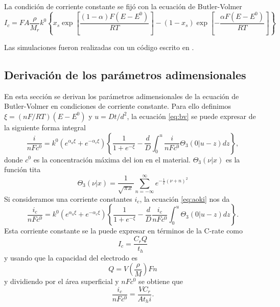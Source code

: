 La condición de corriente constante se fijó con la ecuación de Butler-Volmer
\begin{equation}\label{eq:bv}
    I_c = F A \frac{\rho}{M_r} k^0 \left\{x_s \exp\left[ \frac{(1-\alpha)F(E-E^0)}{RT} \right] - (1 - x_s) \exp\left[ -\frac{\alpha F (E-E^0)}{RT} \right] \right\}
\end{equation}

Las simulaciones fueron realizadas con un código escrito en .


\subsection{Derivación de los parámetros adimensionales} 

En esta sección se derivan los parámetros adimensionales de la ecuación de
Butler-Volmer en condiciones de corriente constante. Para ello definimos
$\xi = (nF/RT)(E - E^0)$ y $u = D t / d^2$, la ecuación \ref{eq:bv} se puede 
expresar de la siguiente forma integral \cite{aoki1984}
\begin{equation}\label{eq:aoki}
    \frac{i}{n F c^0} = k^0 \left(e^{\alpha_a \xi} + e^{-\alpha_c \xi}\right) \left\{ \frac{1}{1+e^{-\xi}} - \frac{d}{D} \int_0^u \frac{i}{n F c^0} \Theta_3(0|u - z) dz \right\},
\end{equation}
donde $c^0$ es la concentración máxima del ion en el material. 
$\Theta_3(\nu|x)$ es la función tita \cite{bieniasz2015}
\begin{equation}
    \Theta_3(\nu|x) = \frac{1}{\sqrt{\pi x}} \sum_{n=-\infty}^{\infty} e^{-\frac{1}{x}(\nu + n)^2}
\end{equation}
Si consideramos una corriente constantes $i_c$, la ecuación \ref{eq:aoki} nos da
\begin{equation}\label{eq:aoki2}
    \frac{i_c}{n F c^0} = k^0 \left(e^{\alpha_a \xi} + e^{-\alpha_c \xi}\right) \left\{ \frac{1}{1+e^{-\xi}} - \frac{d}{D} \frac{i_c}{n F c^0} \int_0^u \Theta_3(0|u - z) dz \right\}.
\end{equation}
Esta corriente constante se la puede expresar en términos de la C-rate como
\begin{equation}
    I_c = \frac{C_r Q}{t_h}
\end{equation}
y usando que la capacidad del electrodo es
\begin{equation}
    Q = V \left( \frac{\rho}{M} \right) F n
\end{equation}
y dividiendo por el área superficial y $n F c^0$ se obtiene que
\begin{equation}\label{eq:i_c}
    \frac{i_c}{n F c^0} = \frac{V C_r}{A t_hi}.
\end{equation}
